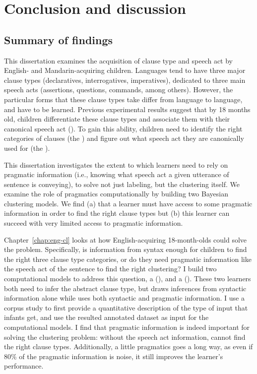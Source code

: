 \chapter{Conclusion and discussion}
\label{chap:discussion}

\section{Summary of findings}
This dissertation examines the acquisition of clause type and speech act by English- and Mandarin-acquiring children. Languages tend to have three major clause types (declaratives, interrogatives, imperatives), dedicated to three main speech acts (assertions, questions, commands, \cite{sz1985speechact} among others). However, the particular forms that these clause types take differ from language to language, and have to be learned. Previous experimental results suggest that by 18 months old, children differentiate these clause types and associate them with their canonical speech act (\cite{geffenmintz2011,geffenmintz2015wordorder,casillas2017turn,perkins2019,marshmallowqueen}). To gain this ability, children need to identify the right categories of clauses (the ) and figure out what speech act they are canonically used for (the ). 

This dissertation investigates the extent to which learners need to rely on pragmatic information (i.e., knowing what speech act a given utterance of sentence is conveying), to solve not just labeling, but the clustering itself. We examine the role of pragmatics computationally by building two Bayesian clustering models. We find (a) that a learner must have access to some pragmatic information in order to find the right clause types but (b) this learner can succeed with very limited access to pragmatic information. 

Chapter~\ref{chap:eng-cl} looks at how English-acquiring 18-month-olds could solve the problem. Specifically, is information from syntax enough for children to find the right three clause type categories, or do they need pragmatic information like the speech act of the sentence to find the right clustering? I build two computational models to address this question, a \distlearner{} (\dlearnerabbr{}), and a \praglearner{} (\plearnerabbr{}). These two learners both need to infer the abstract clause type, but \dlearnerabbr{} draws inferences from syntactic information alone while \plearnerabbr{} uses both syntactic and pragmatic information. I use a corpus study to first provide a quantitative description of the type of input that infants get, and use the resulted annotated dataset as input for the computational models. I find that pragmatic information is indeed important for solving the clustering problem: without the speech act information, \dlearnerabbr{} cannot find the right clause types. Additionally, a little pragmatics goes a long way, as  even if 80\% of the pragmatic information is noise, it still improves the learner's performance. 

